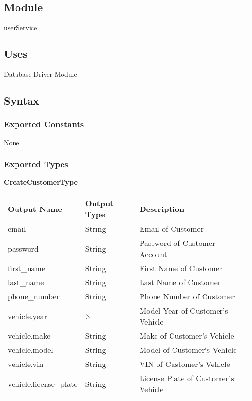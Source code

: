 \documentclass[12pt, titlepage]{article}
\begin{document}
\subsection{Module}

userService

\subsection{Uses}

Database Driver Module

\subsection{Syntax}

\subsubsection{Exported Constants}

None

\subsubsection{Exported Types}

\textbf{CreateCustomerType}

\begin{table}[H]
	\begin{tabular}{|p{}|p{}|p{}|}
		\hline
		\textbf{Output Name}   & \textbf{Output Type} & \textbf{Description}                \\
		\hline
		email                  & String               & Email of Customer                   \\
		\hline
		password               & String               & Password of Customer Account        \\
		\hline
		first\_name            & String               & First Name of Customer              \\
		\hline
		last\_name             & String               & Last Name of Customer               \\
		\hline
		phone\_number          & String               & Phone Number of Customer            \\
		\hline
		vehicle.year           & $\mathbb{N}$         & Model Year of Customer's Vehicle    \\
		\hline
		vehicle.make           & String               & Make of Customer's Vehicle          \\
		\hline
		vehicle.model          & String               & Model of Customer's Vehicle         \\
		\hline
		vehicle.vin            & String               & VIN of Customer's Vehicle           \\
		\hline
		vehicle.license\_plate & String               & License Plate of Customer's Vehicle \\
		\hline
	\end{tabular}
\end{table}
\end{document}
